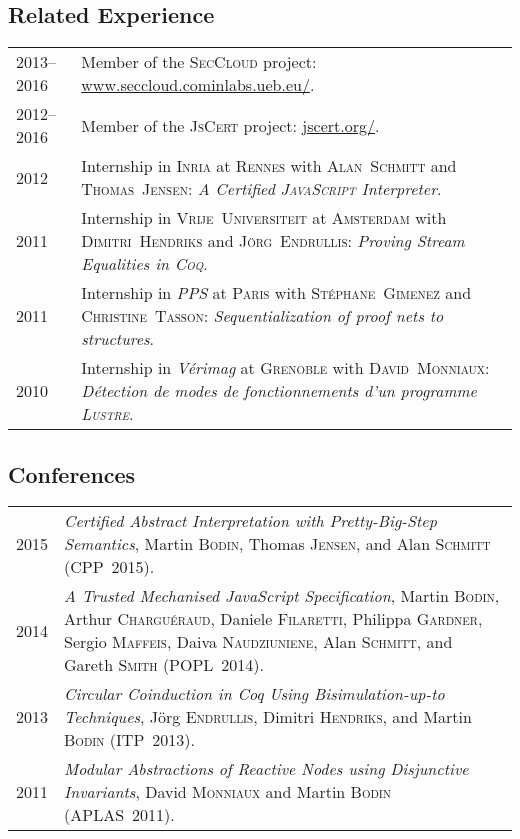 \documentclass[12pt,a4paper]{article}
\makeatletter
\newcommand{\fr}[1]{\foreignlanguage{francais}{\textit{#1}}}
\newenvironment{datecvsection}[1]%
               {\subsection*{#1}%
                 \noindent \begin{tabular}{@{}p{\annee}p{\texte}@{}}}
               {\end{tabular}}
\makeatother
\begin{document}
\begin{datecvsection}{Related Experience}

	2013–2016 & Member of the \textsc{SecCloud} project:  \url{www.seccloud.cominlabs.ueb.eu/}. \\

	2012–2016 & Member of the \textsc{JsCert} project:  \url{jscert.org/}. \\

	2012 & Internship in \textsc{Inria} at \textsc{Rennes} with \textsc{Alan~Schmitt} and \textsc{Thomas~Jensen}:
	\textit{A Certified \textsc{JavaScript} Interpreter}. \\

	2011 & Internship in \textsc{Vrĳe~Universiteit} at \textsc{Amsterdam} with \textsc{Dimitri~Hendriks} and \textsc{Jörg~Endrullis}:
	\textit{Proving Stream Equalities in \textsc{Coq}}. \\

	2011 & Internship in \fr{\sc PPS} at \textsc{Paris} with \textsc{Stéphane~Gimenez} and \textsc{Christine~Tasson}:
	\textit{Sequentialization of proof nets to structures}. \\

	2010 & Internship in \fr{\sc Vérimag} at \textsc{Grenoble} with \textsc{David~Monniaux}:
        \fr{Détection de modes de fonctionnements d’un programme \textsc{Lustre}}. \\

\end{datecvsection}

\begin{datecvsection}{Conferences}

  2015 & \textit{Certified Abstract Interpretation with Pretty-Big-Step Semantics}, Martin \textsc{Bodin}, Thomas \textsc{Jensen}, and Alan \textsc{Schmitt} (CPP~2015). \\

  2014 & \textit{A Trusted Mechanised JavaScript Specification}, Martin \textsc{Bodin}, Arthur \textsc{Charguéraud}, Daniele \textsc{Filaretti}, Philippa \textsc{Gardner}, Sergio \textsc{Maffeis}, Daiva \textsc{Naudziuniene}, Alan \textsc{Schmitt}, and Gareth \textsc{Smith} (POPL~2014). \\

  2013 & \textit{Circular Coinduction in Coq Using Bisimulation-up-to Techniques}, Jörg \textsc{Endrullis}, Dimitri \textsc{Hendriks}, and Martin \textsc{Bodin} (ITP~2013). \\

  2011 & \textit{Modular Abstractions of Reactive Nodes using Disjunctive Invariants}, David \textsc{Monniaux} and Martin \textsc{Bodin} (APLAS~2011). \\

\end{datecvsection}
\end{document}
